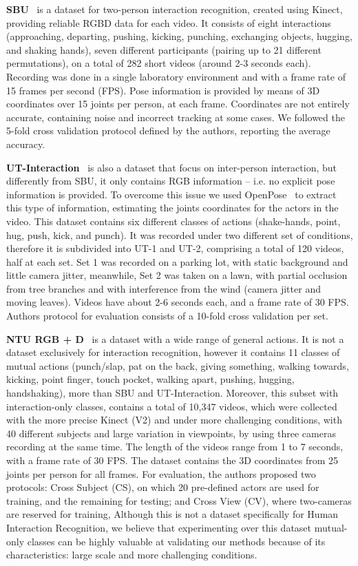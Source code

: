 \documentclass[journal,twoside]{IEEEtran}
\begin{document}
\textbf{SBU}~\cite{Yun2012} is a dataset for two-person interaction recognition, created using Kinect, providing reliable RGBD data for each video. 
It consists of eight interactions (approaching, departing, pushing, kicking, punching, exchanging objects, hugging, and shaking hands), seven different participants (pairing up to 21 different permutations), on a total of 282 short videos (around 2-3 seconds each). 
Recording was done in a single laboratory environment and with a frame rate of 15 frames per second (FPS).
Pose information is provided by means of 3D coordinates over 15 joints per person, at each frame.
Coordinates are not entirely accurate, containing noise and incorrect tracking at some cases.
We followed the 5-fold cross validation protocol defined by the authors, reporting the average accuracy.

\textbf{UT-Interaction}~\cite{Ryoo2009} is also a dataset that focus on inter-person interaction, but differently from SBU, it only contains RGB information -- i.e. no explicit pose information is provided. 
To overcome this issue we used OpenPose~\cite{Cao2018} to extract this type of information, estimating the joints coordinates for the actors in the video.
This dataset contains six different classes of actions (shake-hands, point, hug, push, kick, and punch). It was recorded under two different set of conditions, therefore it is subdivided into UT-1 and UT-2, comprising a total of 120 videos, half at each set. 
Set 1 was recorded on a parking lot, with static background and little camera jitter, meanwhile, Set 2 was taken on a lawn, with partial occlusion from tree branches and with interference from the wind (camera jitter and moving leaves).
Videos have about 2-6 seconds each, and a frame rate of 30 FPS.
Authors protocol for evaluation consists of a 10-fold cross validation per set.

\textbf{NTU RGB + D}~\cite{Shahroudy2016} is a dataset with a wide range of general actions.
It is not a dataset exclusively for interaction recognition, however it contains 11 classes of mutual actions (punch/slap, pat on the back, giving something, walking towards, kicking, point finger, touch pocket, walking apart, pushing, hugging, handshaking), more than SBU and UT-Interaction. 
Moreover, this subset with interaction-only classes, contains a total of 10,347 videos, which were collected with the more precise Kinect (V2) and under more challenging conditions, with 40 different subjects and large variation in viewpoints, by using three cameras recording at the same time.
The length of the videos range from 1 to 7 seconds, with a frame rate of 30 FPS.
The dataset contains the 3D coordinates from 25 joints per person for all frames.
For evaluation, the authors proposed two protocols: Cross Subject (CS), on which 20 pre-defined actors are used for training, and the remaining for testing; and Cross View (CV), where two-cameras are reserved for training, 	
Although this is not a dataset specifically for Human Interaction Recognition, we believe that experimenting over this dataset mutual-only classes can be highly valuable at validating our methods because of its characteristics: large scale and more challenging conditions.
\end{document}
